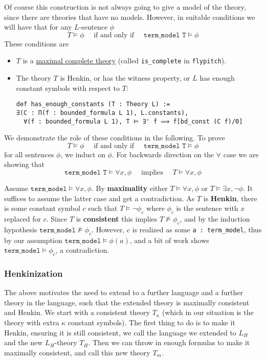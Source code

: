\documentclass{article}
\newcommand{\<}{\langle}
\renewcommand{\>}{\rangle}
\newcommand{\linkto}[2]{\hyperlink{#1}{#2}}
\theoremstyle{definitionstyle}
\theoremstyle{exercisestyle}
\theoremstyle{remarkstyle}
\begin{document}
Of course this construction is not always going to give a model of the
theory, since there are theories that have no models.
However, in suitable conditions we will have that for any $L$-sentence $\phi$
\[
  T \vDash \phi \quad \text{ if and only if } \quad
  \texttt{term\_model T} \vDash \phi
\]
These conditions are
\begin{itemize}
  \item $T$ is a \linkto{is_complete_theory}{maximal complete theory}
        (called \texttt{is\_complete} in \texttt{flypitch}).
  \item The theory $T$ is Henkin, or has the witness property,
        or $L$ has enough constant symbols with respect to $T$:
\begin{lstlisting}
def has_enough_constants (T : Theory L) :=
∃(C : Π(f : bounded_formula L 1), L.constants),
  ∀(f : bounded_formula L 1), T ⊨ ∃' f ⟹ f[bd_const (C f)/0] \end{lstlisting}
\end{itemize}

We demonstrate the role of these conditions in the following.
To prove
\[ T \vDash \phi \quad \text{ if and only if } \quad
  \texttt{term\_model T} \vDash \phi \]
for all sentences $\phi$, we induct on $\phi$.
For backwards direction on the $\forall$ case
we are showing that
\[ \texttt{term\_model T} \vDash \forall x, \phi \quad \text{ implies }
  \quad T \vDash \forall x, \phi \]

Assume $\texttt{term\_model} \vDash \forall x, \phi$.
By \textbf{maximality} either $T \vDash \forall x, \phi$ or
$T \vDash \exists x, \neg \phi$.
It suffices to assume the latter case and get a contradiction.
As $T$ is \textbf{Henkin},
there is some constant symbol $c$ such that $T \vDash \neg \phi_{c}$
where $\phi_{c}$ is the sentence with $x$ replaced for $c$.
Since $T$ is \textbf{consistent} this implies $T \nvDash \phi_{c}$,
and by the induction hypothesis $\texttt{term\_model} \nvDash \phi_{c}$.
However, $c$ is realized as some \texttt{a : term\_model},
thus by our assumption $\texttt{term\_model} \vDash \phi(a)$,
and a bit of work shows $\texttt{term\_model} \vDash \phi_{c}$,
a contradiction.

\subsubsection{Henkinization}

The above motivates the need to extend to a further language and a further theory
in the language, such that the extended theory is maximally consistent and Henkin.
We start with a consistent theory $T_{\kappa}$
(which in our situation is the theory with extra $\kappa$ constant symbols).
The first thing to do is to make it Henkin, ensuring it is still consistent,
we call the language we extended to $L_{H}$ and the new $L_{H}$-theory $T_{H}$.
Then we can throw in enough formulas to make it maximally consistent,
and call this new theory $T_{m}$.
\end{document}
